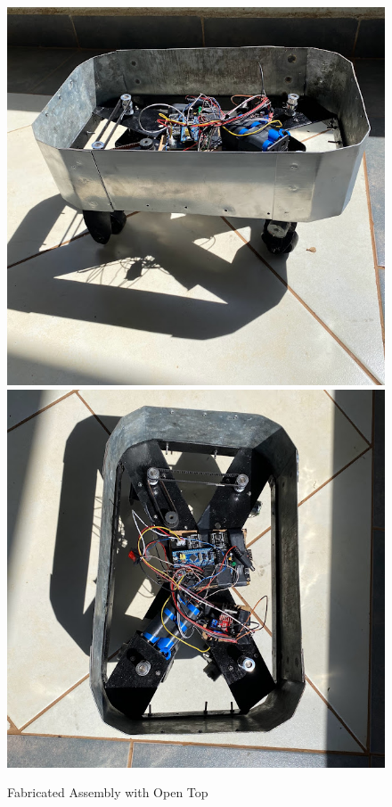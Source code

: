 \begin{figure}[H]
    \centering
    \includegraphics[scale = 0.4]{Figures/finalAssemblyOPEN4.jpg}
    \includegraphics[scale = 0.4]{Figures/finalAssemblyOPEN3.jpg}
    \caption{Fabricated Assembly with Open Top}
    \label{fig:fabassemblywithtop}
\end{figure}

